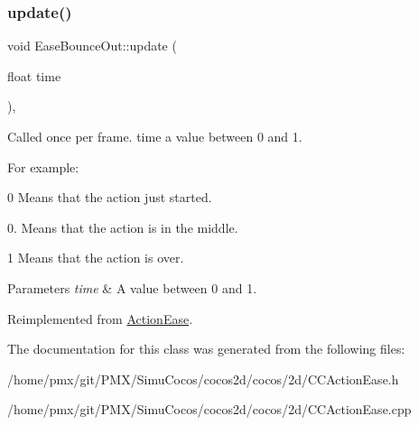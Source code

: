\mbox{\label{classEaseBounceOut_a044e81fb5f2c10b4064891a9bfdae231}} 
\subsubsection{\texorpdfstring{update()}{update()}}
{\footnotesize\ttfamily void Ease\+Bounce\+Out\+::update (\begin{DoxyParamCaption}\item[{float}]{time }\end{DoxyParamCaption})\hspace{0.3cm}{\ttfamily [override]}, {\ttfamily [virtual]}}

Called once per frame. time a value between 0 and 1.

For example\+:
\begin{DoxyItemize}
\item 0 Means that the action just started.
\item 0. Means that the action is in the middle.
\item 1 Means that the action is over.
\end{DoxyItemize}


\begin{DoxyParams}{Parameters}
{\em time} & A value between 0 and 1. \\
\hline
\end{DoxyParams}


Reimplemented from \hyperlink{classActionEase_a77679f09c02cf75fb54776470c339fc5}{Action\+Ease}.



The documentation for this class was generated from the following files\+:\begin{DoxyCompactItemize}
\item 
/home/pmx/git/\+P\+M\+X/\+Simu\+Cocos/cocos2d/cocos/2d/C\+C\+Action\+Ease.\+h\item 
/home/pmx/git/\+P\+M\+X/\+Simu\+Cocos/cocos2d/cocos/2d/C\+C\+Action\+Ease.\+cpp\end{DoxyCompactItemize}
